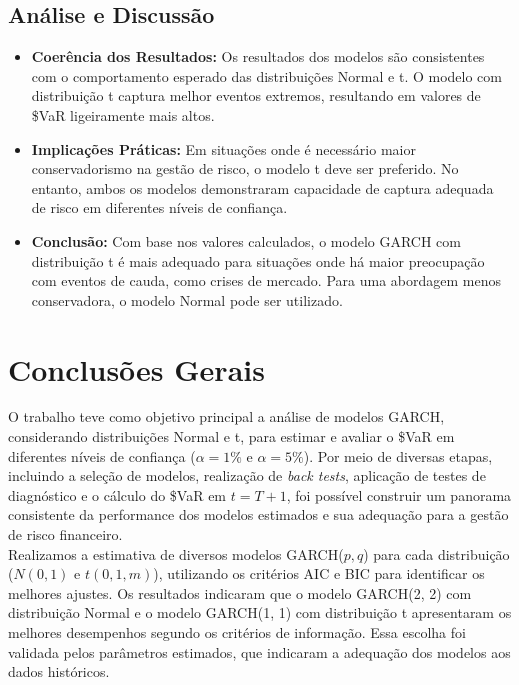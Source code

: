 \documentclass[a4paper, 12pt]{article}
\begin{document}
\subsection{Análise e Discussão}
\begin{itemize}
    \item \textbf{Coerência dos Resultados:}
    Os resultados dos modelos são consistentes com o comportamento esperado das distribuições Normal e t. O modelo com distribuição t captura melhor eventos extremos, resultando em valores de \$VaR ligeiramente mais altos.

    \item \textbf{Implicações Práticas:}
    Em situações onde é necessário maior conservadorismo na gestão de risco, o modelo t deve ser preferido. No entanto, ambos os modelos demonstraram capacidade de captura adequada de risco em diferentes níveis de confiança.

    \item \textbf{Conclusão:}
    Com base nos valores calculados, o modelo GARCH com distribuição t é mais adequado para situações onde há maior preocupação com eventos de cauda, como crises de mercado. Para uma abordagem menos conservadora, o modelo Normal pode ser utilizado.
\end{itemize}


\section{Conclusões Gerais}

O trabalho teve como objetivo principal a análise de modelos GARCH, considerando distribuições Normal e t, para estimar e avaliar o \$VaR em diferentes níveis de confiança (\(\alpha = 1\%\) e \(\alpha = 5\%\)). Por meio de diversas etapas, incluindo a seleção de modelos, realização de \emph{back tests}, aplicação de testes de diagnóstico e o cálculo do \$VaR em \(t = T+1\), foi possível construir um panorama consistente da performance dos modelos estimados e sua adequação para a gestão de risco financeiro.\\


Realizamos a estimativa de diversos modelos GARCH(\(p, q\)) para cada distribuição (\(N(0,1)\) e \(t(0,1,m)\)), utilizando os critérios AIC e BIC para identificar os melhores ajustes. Os resultados indicaram que o modelo GARCH(2, 2) com distribuição Normal e o modelo GARCH(1, 1) com distribuição t apresentaram os melhores desempenhos segundo os critérios de informação. Essa escolha foi validada pelos parâmetros estimados, que indicaram a adequação dos modelos aos dados históricos.\\
\end{document}
